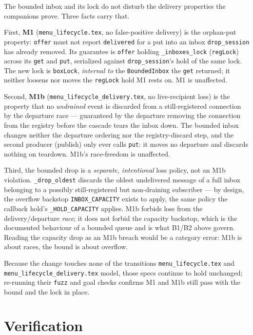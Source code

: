 \documentclass[a4paper,10pt,fleqn]{article}
\begin{document}
The bounded inbox and its lock do not disturb the delivery properties the
companions prove. Three facts carry that.

First, \textbf{M1} (\texttt{menu\_lifecycle.tex}, no false-positive delivery) is
the orphan-put property: \texttt{offer} must not report \texttt{delivered} for a
put into an inbox \texttt{drop\_session} has already removed. Its guarantee is
\texttt{offer} holding \texttt{\_inboxes\_lock} (\texttt{regLock}) across its
\texttt{get} and \texttt{put}, serialized against \texttt{drop\_session}'s hold of
the same lock. The new lock is \texttt{boxLock}, \emph{internal to} the
\texttt{BoundedInbox} the \texttt{get} returned; it neither loosens nor moves the
\texttt{regLock} hold M1 rests on. M1 is unaffected.

Second, \textbf{M1b} (\texttt{menu\_lifecycle\_delivery.tex}, no live-recipient
loss) is the property that no \emph{undrained} event is discarded from a
still-registered connection by the departure race --- guaranteed by the departure
removing the connection from the registry before the cascade tears the inbox down.
The bounded inbox changes neither the departure ordering nor the registry-discard
step, and the second producer (publish) only ever calls \texttt{put}: it moves no
departure and discards nothing on teardown. M1b's race-freedom is unaffected.

Third, the bounded drop is a \emph{separate, intentional} loss policy, not an M1b
violation. \texttt{\_drop\_oldest} discards the oldest undelivered message of a
full inbox belonging to a possibly still-registered but non-draining subscriber
--- by design, the overflow backstop \texttt{INBOX\_CAPACITY} exists to apply, the
same policy the callback hold's \texttt{\_HOLD\_CAPACITY} applies. M1b forbids
loss from the delivery/departure \emph{race}; it does not forbid the capacity
backstop, which is the documented behaviour of a bounded queue and is what B1/B2
above govern. Reading the capacity drop as an M1b breach would be a category
error: M1b is about races, the bound is about overflow.

Because the change touches none of the transitions \texttt{menu\_lifecycle.tex}
and \texttt{menu\_lifecycle\_delivery.tex} model, those specs continue to hold
unchanged; re-running their \texttt{fuzz} and goal checks confirms M1 and M1b
still pass with the bound and the lock in place.

\section{Verification}
\label{sec:verify}
\end{document}
